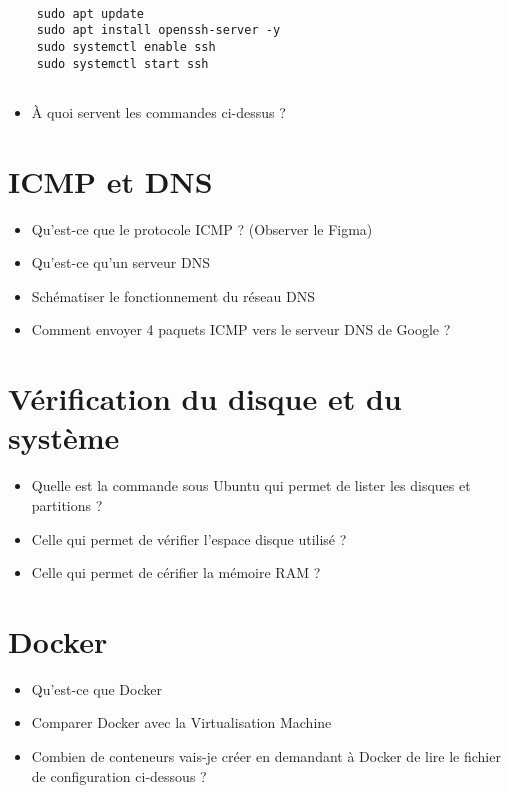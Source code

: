 \documentclass[12pt, letterpaper]{article}
\begin{document}
\begin{verbatim}

    sudo apt update
    sudo apt install openssh-server -y
    sudo systemctl enable ssh
    sudo systemctl start ssh
    
\end{verbatim}
\begin{itemize}
    \item À quoi servent les commandes ci-dessus ? 
\end{itemize}


\section{ICMP et DNS}

\begin{itemize}
    \item Qu'est-ce que le protocole ICMP ? (Observer le Figma)
    \item Qu'est-ce qu'un serveur DNS 
    \item Schématiser le fonctionnement du réseau DNS
    \item Comment envoyer 4 paquets ICMP vers le serveur DNS de Google ?
\end{itemize}


\section{Vérification du disque et du système}

\begin{itemize}
    \item Quelle est la commande sous Ubuntu qui permet de  lister les disques et partitions ?
    \item Celle qui permet de vérifier l’espace disque utilisé ?
    \item Celle qui permet de cérifier la mémoire RAM ?
\end{itemize}



\section{Docker}


\begin{itemize}
    \item Qu'est-ce que Docker 
    \item Comparer Docker avec la Virtualisation Machine
    \item Combien de conteneurs vais-je créer en demandant à Docker de lire le fichier de configuration ci-dessous ?
\end{itemize}
\end{document}
